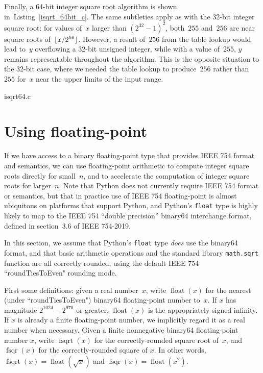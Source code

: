 \documentclass[a4paper]{article}
\DeclarePairedDelimiter\floor{\lfloor}{\rfloor}
\DeclareMathOperator{\fsqrt}{fsqrt}
\DeclareMathOperator{\fsqr}{fsqr}
\DeclareMathOperator{\float}{float}
\theoremstyle{plain}
\theoremstyle{definition}
\begin{document}
Finally, a 64-bit integer square root algorithm is shown
in~Listing~\ref{isqrt_64bit_c}. The same subtleties apply as with the 32-bit
integer square root: for values of~$x$ larger than $(2^32 - 1)^2$, both~$255$
and~$256$ are near square roots of~$\floor{x/2^{56}}$. However, a result
of~$256$ from the table lookup would lead to~$y$ overflowing a 32-bit
unsigned integer, while with a value of~$255$, $y$ remains representable
throughout the algorithm. This is the opposite situation to the 32-bit
case, where we needed the table lookup to produce~$256$ rather than $255$
for~$x$ near the upper limits of the input range.


  {isqrt64.c}

\section{Using floating-point}

If we have access to a binary floating-point type that provides IEEE 754 format
and semantics, we can use floating-point arithmetic to compute integer square
roots directly for small~$n$, and to accelerate the computation of integer
square roots for larger~$n$. Note that Python does not currently require IEEE
754 format or semantics, but that in practice use of IEEE 754 floating-point is
almost ubiquitous on platforms that support Python, and Python's
\lstinline{float} type is highly likely to map to the IEEE 754
``double precision'' binary64 interchange format, defined in section~3.6 of
IEEE 754-2019.

In this section, we assume that Python's \lstinline{float} type \emph{does} use
the binary64 format, and that basic arithmetic operations and the standard
library \lstinline{math.sqrt} function are all correctly rounded, using the
default IEEE 754 ``roundTiesToEven" rounding mode.

First some definitions: given a real number~$x$, write $\float(x)$ for the
nearest (under ``roundTiesToEven") binary64 floating-point number to~$x$. If
$x$ has magnitude $2^{1024} - 2^{970}$ or greater, $\float(x)$ is the
appropriately-signed infinity. If $x$ is already a finite floating-point
number, we implicitly regard it as a real number when necessary. Given a finite
nonnegative binary64 floating-point number $x$, write $\fsqrt(x)$ for the
correctly-rounded square root of~$x$, and $\fsqr(x)$ for the correctly-rounded
square of $x$. In other words, $\fsqrt(x) = \float(\sqrt x)$ and $\fsqr(x) =
\float(x^2)$.
\end{document}
